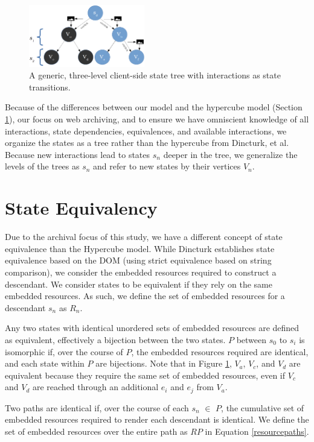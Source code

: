 \documentclass{sig-alternate}
\begin{document}
\begin{figure}[h!]
    \includegraphics[width=0.45\textwidth]{./imgs/state_diagram_www.png}
  \caption{A generic, three-level client-side state tree with interactions as state transitions.}
\label{diagram}
\end{figure}

Because of the differences between our model and the hypercube model (Section \ref{paths}), our focus on web archiving, and to ensure we have omniscient knowledge of all interactions, state dependencies, equivalences, and available interactions, we organize the states as a tree rather than the hypercube from Dincturk, et al. Because new interactions lead to states $s_n$ deeper in the tree, we generalize the levels of the trees as $s_n$ and refer to new states by their vertices $V_n$.




\section{State Equivalency}
\label{paths}
Due to the archival focus of this study, we have a different concept of state equivalence than the Hypercube model. While Dincturk establishes state equivalence based on the DOM (using strict equivalence based on string comparison), we consider the embedded resources required to construct a descendant. We consider states to be equivalent if they rely on the same embedded resources. As such, we define the set of embedded resources for a descendant $s_n$ as $R_n$. 

Any two states with identical unordered sets of embedded resources are defined as equivalent, effectively a bijection between the two states. $P$ between $s_0$ to $s_i$ is isomorphic if, over the course of $P$, the embedded resources required are identical, and each state within $P$ are bijections. Note that in Figure \ref{diagram}, $V_a$, $V_c$, and $V_d$ are equivalent because they require the same set of embedded resources, even if $V_c$ and $V_d$ are reached through an additional $e_i$ and $e_j$ from $V_a$.

Two paths are identical if, over the course of each $s_n$ $\in$ $P$, the cumulative set of embedded resources required to render each descendant is identical. We define the set of embedded resources over the entire path as $RP$ in Equation \ref{resourcepaths}.
\end{document}
